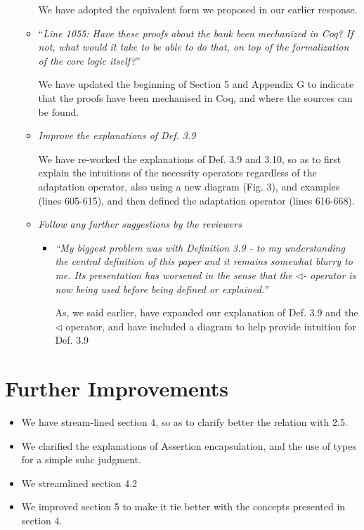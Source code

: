 \documentclass[11pt]{amsart}
\begin{document}
\begin{itemize}
\begin{itemize}
We have adopted the equivalent form we proposed in our earlier response. 
 
\item
``\emph{Line 1055: Have these proofs about the bank been mechanized in Coq? If not, what would it take to be able to do that, on top of the formalization of the core logic itself?}''
 
We have updated the beginning of Section 5 and Appendix G to indicate that the proofs have been mechanised in Coq, and where the sources can be found.
 
 

\item
\emph{Improve the explanations of Def. 3.9}

We have re-worked the explanations of Def. 3.9  and 3.10, so as to first explain the intuitions of the necessity operators regardless of the adaptation operator, also using a new  diagram (Fig. 3), and examples (lines  605-615), and then defined the adaptation operator (lines 616-668).

\item
\emph{Follow any further suggestions by the reviewers}
\begin{itemize}
\item
\emph{``My biggest problem was with Definition 3.9 - to my understanding the central definition of this paper and it remains somewhat blurry to me. Its presentation has worsened in the sense that the $\triangleleft$- operator is now being used before being defined or explained.''}
 
As, we said earlier, have expanded our explanation of Def. 3.9 and the $\triangleleft$ operator, and have included a diagram to help provide intuition for Def. 3.9
 
\end{itemize}
\end{itemize}
\end{itemize}

\section{Further Improvements}

\begin{itemize}
\item
We have stream-lined section 4, so as to clarify better the relation with 2.5.
\item
We clarified the explanations of Assertion encapsulation, and the use of types for a simple suhc judgment.

\item
We streamlined section 4.2

\item
We improved section 5 to make it tie better with the concepts presented in section 4.

\end{itemize}


 
\end{document}
